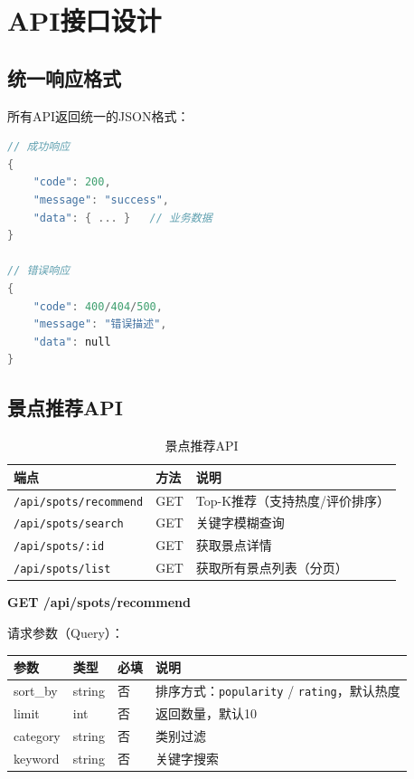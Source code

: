 \documentclass[12pt,a4paper]{report}
\begin{document}
\chapter{API接口设计}

\section{统一响应格式}

所有API返回统一的JSON格式：

\begin{lstlisting}[language=C++, caption={统一响应格式}]
// 成功响应
{
    "code": 200,
    "message": "success",
    "data": { ... }   // 业务数据
}

// 错误响应
{
    "code": 400/404/500,
    "message": "错误描述",
    "data": null
}
\end{lstlisting}

\section{景点推荐API}

\begin{table}[H]
\centering
\caption{景点推荐API}
\small
\begin{tabularx}{\textwidth}{l l X}
\toprule
\textbf{端点} & \textbf{方法} & \textbf{说明} \\
\midrule
\texttt{/api/spots/recommend} & GET & Top-K推荐（支持热度/评价排序） \\
\texttt{/api/spots/search} & GET & 关键字模糊查询 \\
\texttt{/api/spots/:id} & GET & 获取景点详情 \\
\texttt{/api/spots/list} & GET & 获取所有景点列表（分页） \\
\bottomrule
\end{tabularx}
\end{table}

\textbf{GET /api/spots/recommend}

请求参数（Query）：
\begin{table}[H]
\centering
\small
\begin{tabular}{llll}
\toprule
\textbf{参数} & \textbf{类型} & \textbf{必填} & \textbf{说明} \\
\midrule
sort\_by & string & 否 & 排序方式：\texttt{popularity} / \texttt{rating}，默认热度 \\
limit & int & 否 & 返回数量，默认10 \\
category & string & 否 & 类别过滤 \\
keyword & string & 否 & 关键字搜索 \\
\bottomrule
\end{tabular}
\end{table}
\end{document}
